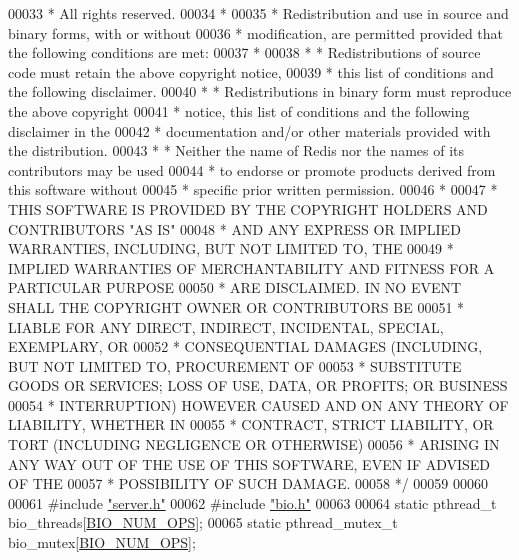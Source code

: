 \begin{DoxyCode}
00033 \textcolor{comment}{ * All rights reserved.}
00034 \textcolor{comment}{ *}
00035 \textcolor{comment}{ * Redistribution and use in source and binary forms, with or without}
00036 \textcolor{comment}{ * modification, are permitted provided that the following conditions are met:}
00037 \textcolor{comment}{ *}
00038 \textcolor{comment}{ *   * Redistributions of source code must retain the above copyright notice,}
00039 \textcolor{comment}{ *     this list of conditions and the following disclaimer.}
00040 \textcolor{comment}{ *   * Redistributions in binary form must reproduce the above copyright}
00041 \textcolor{comment}{ *     notice, this list of conditions and the following disclaimer in the}
00042 \textcolor{comment}{ *     documentation and/or other materials provided with the distribution.}
00043 \textcolor{comment}{ *   * Neither the name of Redis nor the names of its contributors may be used}
00044 \textcolor{comment}{ *     to endorse or promote products derived from this software without}
00045 \textcolor{comment}{ *     specific prior written permission.}
00046 \textcolor{comment}{ *}
00047 \textcolor{comment}{ * THIS SOFTWARE IS PROVIDED BY THE COPYRIGHT HOLDERS AND CONTRIBUTORS "AS IS"}
00048 \textcolor{comment}{ * AND ANY EXPRESS OR IMPLIED WARRANTIES, INCLUDING, BUT NOT LIMITED TO, THE}
00049 \textcolor{comment}{ * IMPLIED WARRANTIES OF MERCHANTABILITY AND FITNESS FOR A PARTICULAR PURPOSE}
00050 \textcolor{comment}{ * ARE DISCLAIMED. IN NO EVENT SHALL THE COPYRIGHT OWNER OR CONTRIBUTORS BE}
00051 \textcolor{comment}{ * LIABLE FOR ANY DIRECT, INDIRECT, INCIDENTAL, SPECIAL, EXEMPLARY, OR}
00052 \textcolor{comment}{ * CONSEQUENTIAL DAMAGES (INCLUDING, BUT NOT LIMITED TO, PROCUREMENT OF}
00053 \textcolor{comment}{ * SUBSTITUTE GOODS OR SERVICES; LOSS OF USE, DATA, OR PROFITS; OR BUSINESS}
00054 \textcolor{comment}{ * INTERRUPTION) HOWEVER CAUSED AND ON ANY THEORY OF LIABILITY, WHETHER IN}
00055 \textcolor{comment}{ * CONTRACT, STRICT LIABILITY, OR TORT (INCLUDING NEGLIGENCE OR OTHERWISE)}
00056 \textcolor{comment}{ * ARISING IN ANY WAY OUT OF THE USE OF THIS SOFTWARE, EVEN IF ADVISED OF THE}
00057 \textcolor{comment}{ * POSSIBILITY OF SUCH DAMAGE.}
00058 \textcolor{comment}{ */}
00059 
00060 
00061 \textcolor{preprocessor}{#}\textcolor{preprocessor}{include} \hyperlink{server_8h}{"server.h"}
00062 \textcolor{preprocessor}{#}\textcolor{preprocessor}{include} \hyperlink{bio_8h}{"bio.h"}
00063 
00064 \textcolor{keyword}{static} pthread\_t bio\_threads[\hyperlink{bio_8h_a544b0595052937cbb10e0ffd1f56d163}{BIO\_NUM\_OPS}];
00065 \textcolor{keyword}{static} pthread\_mutex\_t bio\_mutex[\hyperlink{bio_8h_a544b0595052937cbb10e0ffd1f56d163}{BIO\_NUM\_OPS}];

\end{DoxyCode}

